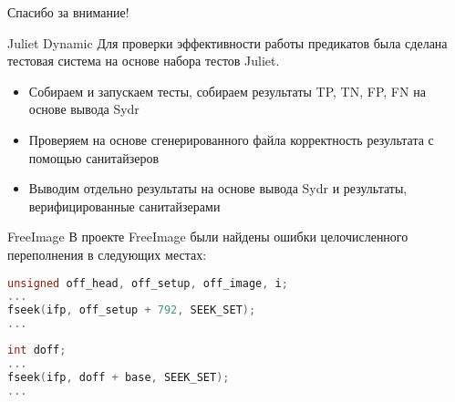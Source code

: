 \documentclass[10pt]{beamer}
\begin{document}
\appendix
\begin{frame}[standout] \vfill Спасибо за внимание! \vfill \end{frame}

\begin{frame}{Juliet Dynamic}
Для проверки эффективности работы предикатов была сделана тестовая система на
основе набора тестов Juliet.
\begin{itemize}
    \item Собираем и запускаем тесты, собираем результаты TP, TN, FP, FN на
        основе вывода Sydr
    \item Проверяем на основе сгенерированного файла корректность результата с
        помощью санитайзеров
    \item Выводим отдельно результаты на основе вывода Sydr и результаты,
        верифицированные санитайзерами
\end{itemize}
\end{frame}

\begin{frame}[fragile]{FreeImage}
В проекте FreeImage были найдены ошибки целочисленного переполнения в следующих
местах:

\begin{lstlisting}[language=C, basicstyle=\small\ttfamily,
                   xleftmargin=2em,
                   captionpos=b,
                   label=lst:freeimage_bmp_overflow]
unsigned off_head, off_setup, off_image, i;
...
fseek(ifp, off_setup + 792, SEEK_SET);
...
\end{lstlisting}

\begin{lstlisting}[language=C, basicstyle=\small\ttfamily,
                   xleftmargin=2em,
                   captionpos=b,
                   label=lst:freeimage_tiff_overflow]
int doff;
...
fseek(ifp, doff + base, SEEK_SET);
...
\end{lstlisting}
\end{frame}
\end{document}
